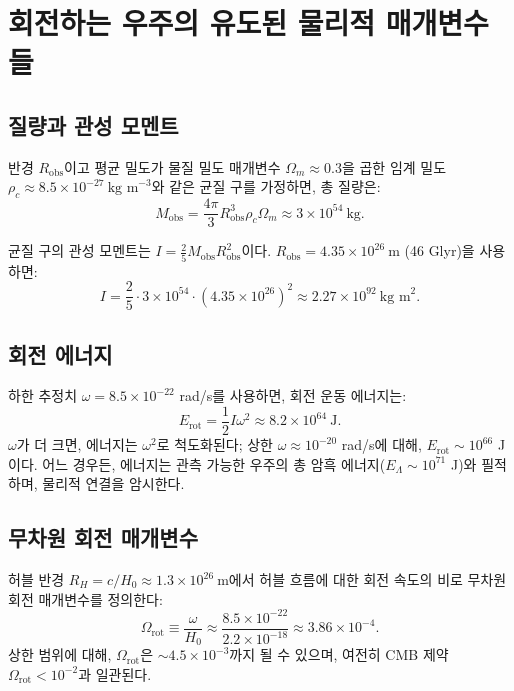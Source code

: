 \documentclass[11pt,a4paper]{article}
\newcommand{\Omegarot}{\Omega_{\mathrm{rot}}}
\begin{document}
	\section{회전하는 우주의 유도된 물리적 매개변수들}
	
	\subsection{질량과 관성 모멘트}
	
	반경 \(R_{\text{obs}}\)이고 평균 밀도가 물질 밀도 매개변수 \(\Omega_m \approx 0.3\)을 곱한 임계 밀도 \(\rho_c \approx 8.5\times10^{-27}\ \text{kg m}^{-3}\)와 같은 균질 구를 가정하면, 총 질량은:
	\begin{equation}
		M_{\text{obs}} = \frac{4\pi}{3} R_{\text{obs}}^3 \rho_c \Omega_m \approx 3 \times 10^{54}\ \text{kg}.
	\end{equation}
	
	균질 구의 관성 모멘트는 \(I = \frac{2}{5} M_{\text{obs}} R_{\text{obs}}^2\)이다. \(R_{\text{obs}} = 4.35\times10^{26}\ \text{m}\) (46 Glyr)을 사용하면:
	\begin{equation}
		I = \frac{2}{5} \cdot 3\times10^{54} \cdot (4.35\times10^{26})^2 \approx 2.27 \times 10^{92}\ \text{kg m}^2.
	\end{equation}
	
	\subsection{회전 에너지}
	
	하한 추정치 \(\omega = 8.5\times10^{-22}\) rad/s를 사용하면, 회전 운동 에너지는:
	\begin{equation}
		E_{\text{rot}} = \frac{1}{2} I \omega^2 \approx 8.2 \times 10^{64}\ \text{J}.
	\end{equation}
	\(\omega\)가 더 크면, 에너지는 \(\omega^2\)로 척도화된다; 상한 \(\omega \approx 10^{-20}\) rad/s에 대해, \(E_{\text{rot}} \sim 10^{66}\) J이다. 어느 경우든, 에너지는 관측 가능한 우주의 총 암흑 에너지(\(E_{\Lambda} \sim 10^{71}\) J)와 필적하며, 물리적 연결을 암시한다.
	
	\subsection{무차원 회전 매개변수}
	
	허블 반경 \(R_H = c/H_0 \approx 1.3\times10^{26}\ \text{m}\)에서 허블 흐름에 대한 회전 속도의 비로 무차원 회전 매개변수를 정의한다:
	\begin{equation}
		\Omegarot \equiv \frac{\omega}{H_0} \approx \frac{8.5\times10^{-22}}{2.2\times10^{-18}} \approx 3.86\times10^{-4}.
	\end{equation}
	상한 범위에 대해, \(\Omegarot\)은 \(\sim 4.5\times10^{-3}\)까지 될 수 있으며, 여전히 CMB 제약 \(\Omegarot < 10^{-2}\)과 일관된다.
	
\end{document}
